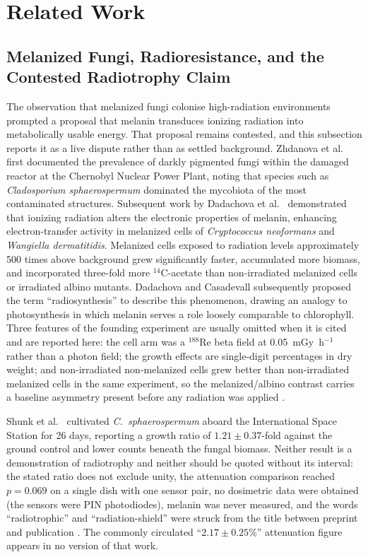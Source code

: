 \documentclass[11pt]{article}
\begin{document}
\section{Related Work}

\subsection{Melanized Fungi, Radioresistance, and the Contested Radiotrophy Claim}

The observation that melanized fungi colonise high-radiation environments prompted a proposal that
melanin transduces ionizing radiation into metabolically usable energy. That proposal remains
contested, and this subsection reports it as a live dispute rather than as settled background.
Zhdanova et al.\ \cite{zhdanova2000}
first documented the prevalence of darkly pigmented fungi within the damaged reactor at the
Chernobyl Nuclear Power Plant, noting that species such as \textit{Cladosporium sphaerospermum}
dominated the mycobiota of the most contaminated structures. Subsequent work by Dadachova et
al.\ \cite{dadachova2007} demonstrated that ionizing radiation alters the electronic properties of
melanin, enhancing electron-transfer activity in melanized cells of \textit{Cryptococcus neoformans}
and \textit{Wangiella dermatitidis}. Melanized cells exposed to radiation levels approximately 500
times above background grew significantly faster, accumulated more biomass, and incorporated
three-fold more ${}^{14}$C-acetate than non-irradiated melanized cells or irradiated albino
mutants. Dadachova and Casadevall \cite{dadachova2008} subsequently proposed the term
``radiosynthesis'' to describe this phenomenon, drawing an analogy to photosynthesis in which
melanin serves a role loosely comparable to chlorophyll. Three features of the founding experiment
are usually omitted when it is cited and are reported here: the cell arm was a $^{188}$Re beta
field at 0.05~mGy~h$^{-1}$ rather than a photon field; the growth effects are single-digit
percentages in dry weight; and non-irradiated non-melanized cells grew better than non-irradiated
melanized cells in the same experiment, so the melanized/albino contrast carries a baseline
asymmetry present before any radiation was applied \cite{audit2026}.

Shunk et al.\ \cite{shunk2022} cultivated \textit{C.\ sphaerospermum} aboard the International
Space Station for 26 days, reporting a growth ratio of $1.21 \pm 0.37$-fold against the ground
control and lower counts beneath the fungal biomass. Neither result is a demonstration of
radiotrophy and neither should be quoted without its interval: the stated ratio does not exclude
unity, the attenuation comparison reached $p = 0.069$ on a single dish with one sensor pair, no
dosimetric data were obtained (the sensors were PIN photodiodes), melanin was never measured, and
the words ``radiotrophic'' and ``radiation-shield'' were struck from the title between preprint and
publication \cite{audit2026}. The commonly circulated ``$2.17 \pm 0.25\%$'' attenuation figure
appears in no version of that work.
\end{document}
